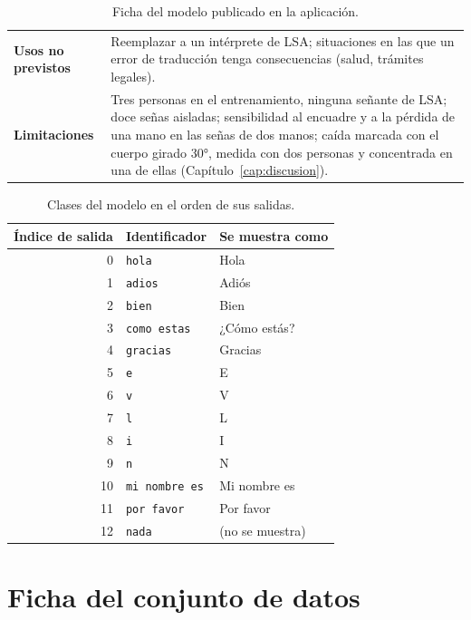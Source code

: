 \begin{table}[h]
\begin{tabular}{p{4cm}p{10cm}}
        \textbf{Usos no previstos} & Reemplazar a un intérprete de LSA; situaciones en las que un error de traducción tenga consecuencias (salud, trámites legales). \\
        \textbf{Limitaciones} & Tres personas en el entrenamiento, ninguna señante de LSA; doce señas aisladas; sensibilidad al encuadre y a la pérdida de una mano en las señas de dos manos; caída marcada con el cuerpo girado 30°, medida con dos personas y concentrada en una de ellas (Capítulo~\ref{cap:discusion}). \\
        \bottomrule
    \end{tabular}
    \caption{Ficha del modelo publicado en la aplicación.}
    \label{tab:ficha-modelo}
\end{table}

\begin{table}[h]
    \centering
    \begin{tabular}{rll}
        \toprule
        Índice de salida & Identificador & Se muestra como \\
        \midrule
        0 & \texttt{hola} & Hola \\
        1 & \texttt{adios} & Adiós \\
        2 & \texttt{bien} & Bien \\
        3 & \texttt{como estas} & ¿Cómo estás? \\
        4 & \texttt{gracias} & Gracias \\
        5 & \texttt{e} & E \\
        6 & \texttt{v} & V \\
        7 & \texttt{l} & L \\
        8 & \texttt{i} & I \\
        9 & \texttt{n} & N \\
        10 & \texttt{mi nombre es} & Mi nombre es \\
        11 & \texttt{por favor} & Por favor \\
        12 & \texttt{nada} & (no se muestra) \\
        \bottomrule
    \end{tabular}
    \caption{Clases del modelo en el orden de sus salidas.}
    \label{tab:clases}
\end{table}

\chapter{Ficha del conjunto de datos}
\label{ap:ficha-datos}

